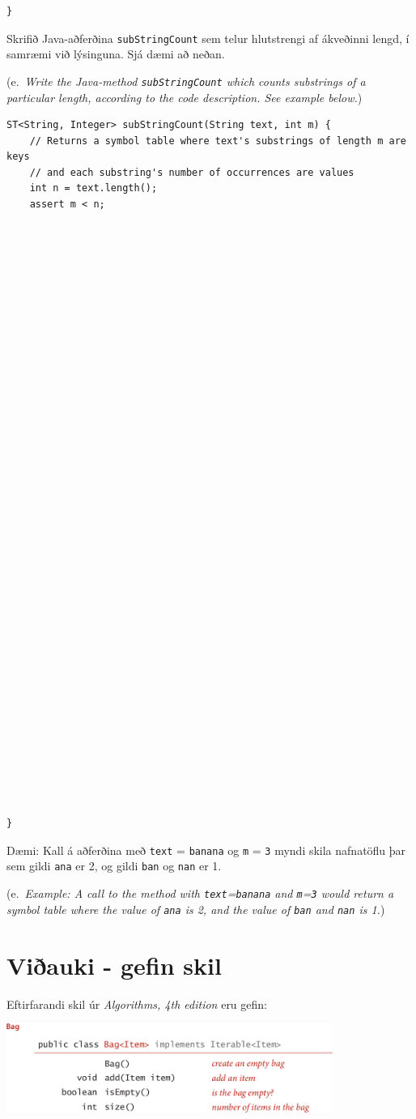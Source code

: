 \documentclass[addpoints]{exam}
\newcommand{\eng}[1]{(e.\ \emph{#1})}
\begin{document}
\begin{questions}
\begin{verbatim}
}
\end{verbatim}



\newpage 
\question[4] Skrifið Java-aðferðina \texttt{subStringCount} sem telur hlutstrengi af ákveðinni lengd, í samræmi við lýsinguna. Sjá dæmi að neðan.

\eng{Write the Java-method \texttt{subStringCount} which counts substrings of a particular length, according to the code description. See example below.}

\begin{verbatim}
ST<String, Integer> subStringCount(String text, int m) {
    // Returns a symbol table where text's substrings of length m are keys
    // and each substring's number of occurrences are values
    int n = text.length();
    assert m < n;






































}
\end{verbatim}

Dæmi: Kall á aðferðina með \texttt{text} = \texttt{banana} og \texttt{m} = \texttt{3} myndi skila nafnatöflu þar sem gildi \texttt{ana} er 2, og gildi \texttt{ban} og \texttt{nan} er 1.

\eng{Example: A call to the method with \texttt{text}=\texttt{banana} and \texttt{m}=\texttt{3} would return a symbol table where the value of \texttt{ana} is 2, and the value of \texttt{ban} and \texttt{nan} is 1.}

\newpage
\section{Viðauki - gefin skil}
Eftirfarandi skil úr \emph{Algorithms, 4th edition} eru gefin:
\begin{center}
\includegraphics[width=0.8\textwidth]{Pics/API-Bag}


\end{center}
\end{questions}
\end{document}
